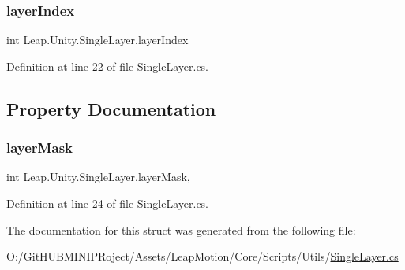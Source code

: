 \subsubsection{\texorpdfstring{layerIndex}{layerIndex}}
{\footnotesize\ttfamily int Leap.\+Unity.\+Single\+Layer.\+layer\+Index}



Definition at line 22 of file Single\+Layer.\+cs.



\subsection{Property Documentation}
\mbox{\label{struct_leap_1_1_unity_1_1_single_layer_a7679475c49c9314d9849150b8bc84e70}} 
\subsubsection{\texorpdfstring{layerMask}{layerMask}}
{\footnotesize\ttfamily int Leap.\+Unity.\+Single\+Layer.\+layer\+Mask\hspace{0.3cm}{\ttfamily [get]}, {\ttfamily [set]}}



Definition at line 24 of file Single\+Layer.\+cs.



The documentation for this struct was generated from the following file\+:\begin{DoxyCompactItemize}
\item 
O\+:/\+Git\+H\+U\+B\+M\+I\+N\+I\+P\+Roject/\+Assets/\+Leap\+Motion/\+Core/\+Scripts/\+Utils/\mbox{\hyperlink{_single_layer_8cs}{Single\+Layer.\+cs}}\end{DoxyCompactItemize}
